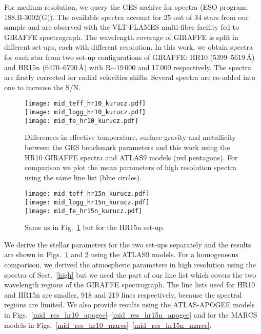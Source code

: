 \documentclass[fleqn,usenatbib]{mnras}
\begin{document}
For medium resolution, we query the GES archive for spectra (ESO program: 188.B-3002(G)). 
The available spectra account for 25 out of 34 stars from our sample and are observed with the VLT-FLAMES multi-fiber facility fed to GIRAFFE spectrograph. 
The wavelength coverage of GIRAFFE is split in different set-ups, each with different resolution. 
In this work, we obtain spectra for each star from two set-up configurations of GIRAFFE: HR10 (5399--5619\,\AA{}) and HR15n (6470--6790\,\AA{}) with R$\sim$19\,000 and 17\,000 respectively. 
The spectra are firstly corrected for radial velocities shifts. Several spectra are co-added into one to increase the S/N. 

\begin{figure}
  \centering
   \texttt{[image: mid\_teff\_hr10\_kurucz.pdf]} \\
   \texttt{[image: mid\_logg\_hr10\_kurucz.pdf]} \\
   \texttt{[image: mid\_fe\_hr10\_kurucz.pdf]}
  \caption{Differences in effective temperature, surface gravity and metallicity between the GES benchmark parameters and this work using the HR10 GIRAFFE spectra and ATLAS9 models (red pentagons). 
  For comparison we plot the mean parameters of high resolution spectra using the same line list (blue circles).}
  \label{mid_res_hr10}
\end{figure}

\begin{figure}
  \centering
   \texttt{[image: mid\_teff\_hr15n\_kurucz.pdf]} \\
   \texttt{[image: mid\_logg\_hr15n\_kurucz.pdf]} \\
   \texttt{[image: mid\_fe\_hr15n\_kurucz.pdf]}
  \caption{Same as in Fig.~\ref{mid_res_hr10} but for the HR15n set-up. }
  \label{mid_res_hr15n}
\end{figure}


We derive the stellar parameters for the two set-ups separately and the results are shown in Figs.~\ref{mid_res_hr10} and \ref{mid_res_hr15n} using the ATLAS9 models. 
For a homogeneous comparison, we derived the atmospheric parameters in high resolution using the spectra of Sect.~\ref{high} but we used the part of our line list which 
covers the two wavelength regions of the GIRAFFE spectrograph. The line lists used for HR10 and HR15n are smaller, 918 and 219 lines respectively, because the spectral regions 
are limited. We also provide results using the ATLAS-APOGEE models in  Figs.~\ref{mid_res_hr10_apogee}--\ref{mid_res_hr15n_apogee} and for the MARCS models in 
Figs.~\ref{mid_res_hr10_marcs}--\ref{mid_res_hr15n_marcs}. 
\end{document}
